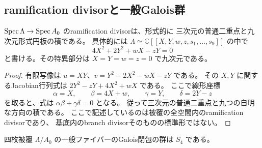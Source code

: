 \subsection{ramification divisorと一般Galois群}

\begin{corollary}\label{cor:four-ramification-v23}
$\operatorname{Spec}\Lambda\to\operatorname{Spec} A_0$ のramification divisorは、形式的に
三次元の普通二重点と九次元形式円板の積である。
具体的には $\Lambda\simeq\mathbb C[[X,Y,w,z,s_1,\ldots,s_9]]$ の中で
\[
 4X^2+2Y^2+wX-zY=0
 \label{eq:four-ramification-v23}
\]
と書ける。その特異部分は $X=Y=w=z=0$ で九次元である。
\end{corollary}

\begin{proof}
有限写像は $u=XY$、$v=Y^2-2X^2-wX-zY$ である。
その $X,Y$ に関するJacobian行列式は
$2Y^2-zY+4X^2+wX$ である。
ここで線形座標
\[
 \alpha=X,\qquad\beta=4X+w,\qquad
 \gamma=Y,\qquad\delta=2Y-z
\]
を取ると、式は $\alpha\beta+\gamma\delta=0$ となる。
従って三次元の普通二重点と九つの自明な方向の積である。
ここで記述しているのは被覆の全空間内のramification divisorであり、
基底内のbranch divisorそのものの標準形ではない。
\end{proof}

\begin{theorem}\label{thm:four-S4-v23}
四枚被覆 $\Lambda/A_0$ の一般ファイバーのGalois閉包の群は $S_4$ である。
\end{theorem}

